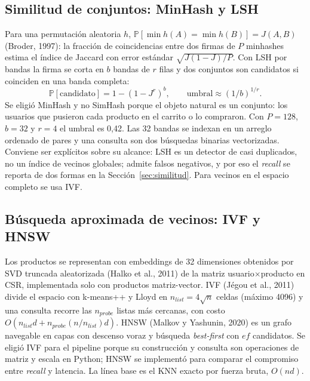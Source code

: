 \documentclass[11pt,letterpaper]{article}
\begin{document}
\subsection{Similitud de conjuntos: MinHash y LSH}
Para una permutaci\'on aleatoria $h$, $\mathbb{P}[\min h(A)=\min h(B)] = J(A,B)$ (Broder, 1997): la fracci\'on de coincidencias entre dos firmas de $P$ minhashes estima el \'indice de Jaccard con error est\'andar $\sqrt{J(1-J)/P}$. Con LSH por bandas la firma se corta en $b$ bandas de $r$ filas y dos conjuntos son candidatos si coinciden en una banda completa:
\begin{equation}
\mathbb{P}[\text{candidato}] = 1-\left(1-J^{r}\right)^{b}, \qquad \text{umbral} \approx \left(1/b\right)^{1/r}.
\end{equation}
Se eligi\'o MinHash y no SimHash porque el objeto natural es un conjunto: los usuarios que pusieron cada producto en el carrito o lo compraron. Con $P=128$, $b=32$ y $r=4$ el umbral es 0,42. Las 32 bandas se indexan en un arreglo ordenado de pares y una consulta son dos b\'usquedas binarias vectorizadas. Conviene ser expl\'icitos sobre su alcance: LSH es un detector de casi duplicados, no un \'indice de vecinos globales; admite falsos negativos, y por eso el \emph{recall} se reporta de dos formas en la Secci\'on~\ref{sec:similitud}. Para vecinos en el espacio completo se usa IVF.

\subsection{B\'usqueda aproximada de vecinos: IVF y HNSW}
Los productos se representan con embeddings de 32 dimensiones obtenidos por SVD truncada aleatorizada (Halko et al., 2011) de la matriz usuario$\times$producto en CSR, implementada solo con productos matriz-vector. IVF (J\'egou et al., 2011) divide el espacio con k-means++ y Lloyd en $n_{list}=4\sqrt{n}$ celdas (m\'aximo 4096) y una consulta recorre las $n_{probe}$ listas m\'as cercanas, con costo $O(n_{list}d + n_{probe}(n/n_{list})d)$. HNSW (Malkov y Yashunin, 2020) es un grafo navegable en capas con descenso voraz y b\'usqueda \emph{best-first} con $ef$ candidatos. Se eligi\'o IVF para el pipeline porque su construcci\'on y consulta son operaciones de matriz y escala en Python; HNSW se implement\'o para comparar el compromiso entre \emph{recall} y latencia. La l\'inea base es el KNN exacto por fuerza bruta, $O(nd)$.
\end{document}
